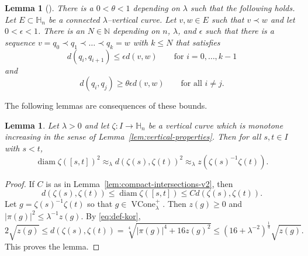 \documentclass[12pt,reqno]{amsart}
\newcommand{\HH}{\mathbb{H}}
\newcommand{\from}{\colon}
\newtheorem{lemma}[thm]{Lemma}
\theoremstyle{remark}
\newcommand{\0}{\mathbf{0}}
\renewcommand{\1}{\mathbf 1}
\DeclareMathOperator{\VCone}{VCone}
\DeclareMathOperator{\diam}{diam}
\begin{document}
\begin{lemma}[{\cite[Lemma 3.5]{AY-Vertical}}]\label{lem:Biholder}
  There is a $0<\theta<1$ depending on $\lambda$ such that the following holds. 
  Let $E\subset \HH_n$ be a connected $\lambda$--vertical curve.
  Let $v, w\in E$ such that $v\prec w$ and let $0 < \epsilon < 1$. There is an $N\in \mathbb{N}$ depending on $n$, $\lambda$, and $\epsilon$ such that there is a sequence $v=q_0\prec q_1\prec \ldots\prec q_k=w$ with $k\leq N$ that satisfies
  \begin{equation}\label{eqn:biHolder-upper}
    d(q_i,q_{i+1})\leq \epsilon d(v,w)\qquad \text{for $i=0,\dots,k-1$}
  \end{equation}
  and
  \begin{equation}\label{eqn:biHolder-lower}
    d(q_i,q_j)\geq \theta \epsilon d(v,w)\qquad \text{for all $i\ne j$.}
  \end{equation}
\end{lemma}

The following lemmas are consequences of these bounds.
\begin{lemma}\label{lem:vertical-diameter-v2}
  Let $\lambda>0$ and let $\zeta\from I\to \HH_n$ be a vertical curve which is monotone increasing in the sense of Lemma~\ref{lem:vertical-properties}. Then for all $s,t\in I$ with $s<t$,
  $$\diam \zeta([s,t])^2 \approx_\lambda d(\zeta(s),\zeta(t))^2\approx_\lambda z(\zeta(s)^{-1} \zeta(t)).$$
\end{lemma}
\begin{proof}
  If $C$ is as in Lemma~\ref{lem:compact-intersections-v2}, then  
  $$d(\zeta(s),\zeta(t))\le \diam \zeta([s,t]) \le C d(\zeta(s),\zeta(t)).$$
  Let $g=\zeta(s)^{-1}\zeta(t)$ so that $g\in \VCone_\lambda^+$. Then $z(g)\ge 0$ and $|\pi(g)|^2 \le \lambda^{-1}z(g)$. By \eqref{eq:def-kor}, 
  $$2\sqrt{z(g)} \le d(\zeta(s),\zeta(t)) = \sqrt[4]{|\pi(g)|^4 + 16 z(g)^2} \le (16 + \lambda^{-2})^{\frac{1}{4}}\sqrt{z(g)}.$$
  This proves the lemma.
\end{proof}
\end{document}
